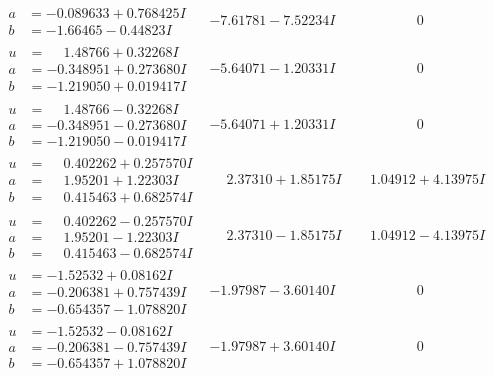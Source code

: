 \documentclass[1p]{elsarticle_modified}
\theoremstyle{definition}
\begin{document}
$$\begin{array}{c|c|c}
\begin{aligned}
a &= -0.089633 + 0.768425 I \\
b &= -1.66465 - 0.44823 I\end{aligned}
 & -7.61781 - 7.52234 I & \phantom{-0.000000 } 0 \\ \hline\begin{aligned}
u &= \phantom{-}1.48766 + 0.32268 I \\
a &= -0.348951 + 0.273680 I \\
b &= -1.219050 + 0.019417 I\end{aligned}
 & -5.64071 - 1.20331 I & \phantom{-0.000000 } 0 \\ \hline\begin{aligned}
u &= \phantom{-}1.48766 - 0.32268 I \\
a &= -0.348951 - 0.273680 I \\
b &= -1.219050 - 0.019417 I\end{aligned}
 & -5.64071 + 1.20331 I & \phantom{-0.000000 } 0 \\ \hline\begin{aligned}
u &= \phantom{-}0.402262 + 0.257570 I \\
a &= \phantom{-}1.95201 + 1.22303 I \\
b &= \phantom{-}0.415463 + 0.682574 I\end{aligned}
 & \phantom{-}2.37310 + 1.85175 I & \phantom{-}1.04912 + 4.13975 I \\ \hline\begin{aligned}
u &= \phantom{-}0.402262 - 0.257570 I \\
a &= \phantom{-}1.95201 - 1.22303 I \\
b &= \phantom{-}0.415463 - 0.682574 I\end{aligned}
 & \phantom{-}2.37310 - 1.85175 I & \phantom{-}1.04912 - 4.13975 I \\ \hline\begin{aligned}
u &= -1.52532 + 0.08162 I \\
a &= -0.206381 + 0.757439 I \\
b &= -0.654357 - 1.078820 I\end{aligned}
 & -1.97987 - 3.60140 I & \phantom{-0.000000 } 0 \\ \hline\begin{aligned}
u &= -1.52532 - 0.08162 I \\
a &= -0.206381 - 0.757439 I \\
b &= -0.654357 + 1.078820 I\end{aligned}
 & -1.97987 + 3.60140 I & \phantom{-0.000000 } 0 \\ \hline\begin{aligned}

\end{aligned}
\end{array}$$
\end{document}
